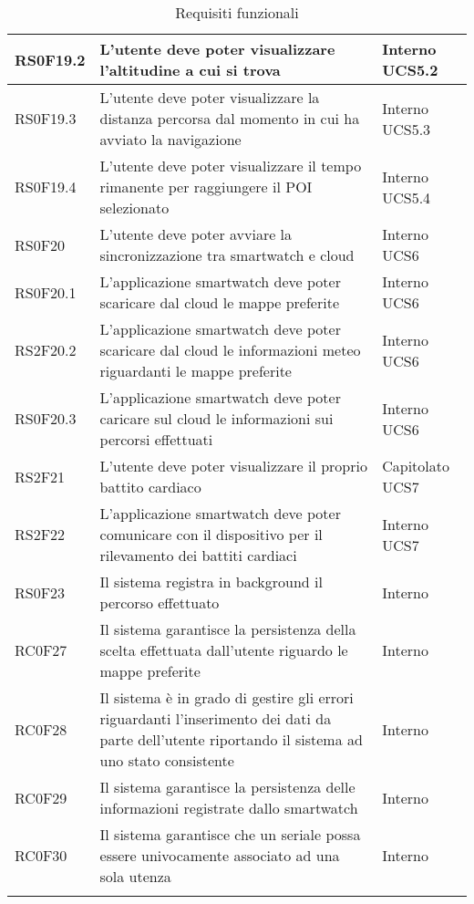 \begin{center}
\begin{longtable}{|l|p{7cm}|p{1.7cm}|}
RS0F19.2	& L'utente deve poter visualizzare l'altitudine a cui si trova & Interno UCS5.2 \\\hline
RS0F19.3	& L'utente deve poter visualizzare la distanza percorsa dal momento in cui ha avviato la navigazione & Interno UCS5.3 \\\hline
RS0F19.4	& L'utente deve poter visualizzare il tempo rimanente per raggiungere il POI selezionato & Interno UCS5.4 \\\hline
RS0F20		& L'utente deve poter avviare la sincronizzazione tra smartwatch e cloud & Interno UCS6 \\\hline
RS0F20.1	& L'applicazione smartwatch deve poter scaricare dal cloud le mappe preferite & Interno UCS6 \\\hline
RS2F20.2	& L'applicazione smartwatch deve poter scaricare dal cloud le informazioni meteo riguardanti le mappe preferite & Interno UCS6 \\\hline
RS0F20.3	& L'applicazione smartwatch deve poter caricare sul cloud le informazioni sui percorsi effettuati & Interno UCS6 \\\hline
RS2F21		& L'utente deve poter visualizzare il proprio battito cardiaco & Capitolato UCS7 \\\hline
RS2F22		& L'applicazione smartwatch deve poter comunicare con il dispositivo per il rilevamento dei battiti cardiaci & Interno UCS7 \\\hline
RS0F23		& Il sistema registra in background il percorso effettuato & Interno \\\hline
RC0F27		& Il sistema garantisce la persistenza della scelta effettuata dall'utente riguardo le mappe preferite & Interno \\\hline
RC0F28		& Il sistema è in grado di gestire gli errori riguardanti l'inserimento dei dati da parte dell'utente riportando il sistema ad uno stato consistente & Interno \\\hline
RC0F29		& Il sistema garantisce la persistenza delle informazioni registrate dallo smartwatch & Interno \\\hline
RC0F30		& Il sistema garantisce che un seriale possa essere univocamente associato ad una sola utenza & Interno \\\hline
\caption{Requisiti funzionali}
\end{longtable}
\egroup
\end{center}

